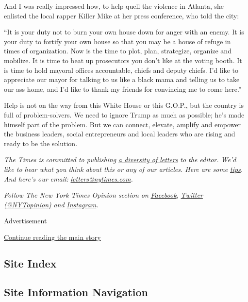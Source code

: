 And I was really impressed how, to help quell the violence in Atlanta,
she enlisted the local rapper Killer Mike at her press conference, who
told the city:

``It is your duty not to burn your own house down for anger with an
enemy. It is your duty to fortify your own house so that you may be a
house of refuge in times of organization. Now is the time to plot, plan,
strategize, organize and mobilize. It is time to beat up prosecutors you
don't like at the voting booth. It is time to hold mayoral offices
accountable, chiefs and deputy chiefs. I'd like to appreciate our mayor
for talking to us like a black mama and telling us to take our ass home,
and I'd like to thank my friends for convincing me to come here.''

Help is not on the way from this White House or this G.O.P., but the
country is full of problem-solvers. We need to ignore Trump as much as
possible; he's made himself part of the problem. But we can connect,
elevate, amplify and empower the business leaders, social entrepreneurs
and local leaders who are rising and ready to be the solution.

\emph{The Times is committed to publishing}
\href{https://www.nytimes.com/2019/01/31/opinion/letters/letters-to-editor-new-york-times-women.html}{\emph{a
diversity of letters}} \emph{to the editor. We'd like to hear what you
think about this or any of our articles. Here are some}
\href{https://help.nytimes.com/hc/en-us/articles/115014925288-How-to-submit-a-letter-to-the-editor}{\emph{tips}}\emph{.
And here's our email:}
\href{mailto:letters@nytimes.com}{\emph{letters@nytimes.com}}\emph{.}

\emph{Follow The New York Times Opinion section on}
\href{https://www.facebook.com/nytopinion}{\emph{Facebook}}\emph{,}
\href{http://twitter.com/NYTOpinion}{\emph{Twitter (@NYTopinion)}}
\emph{and}
\href{https://www.instagram.com/nytopinion/}{\emph{Instagram}}\emph{.}

Advertisement

\protect\hyperlink{after-bottom}{Continue reading the main story}

\hypertarget{site-index}{%
\subsection{Site Index}\label{site-index}}

\hypertarget{site-information-navigation}{%
\subsection{Site Information
Navigation}\label{site-information-navigation}}

